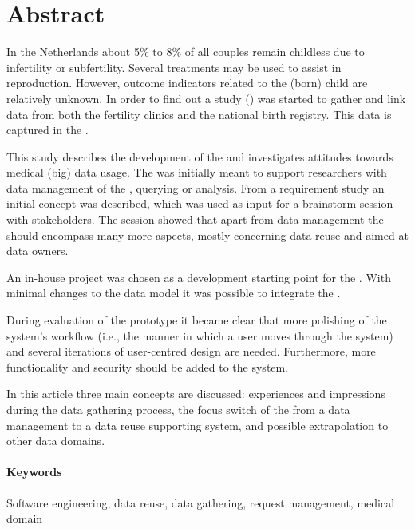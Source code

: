 \clearpage
{}
{}

\section*{Abstract}

In the Netherlands about 5\% to 8\% of all couples remain childless due to infertility or subfertility. 
Several treatments may be used to assist in reproduction. 
However, outcome indicators related to the (born) child are relatively unknown. 
In order to find out a study (\project{}) was started to gather and link data from both the fertility clinics and the national birth registry. 
This data is captured in the \projectdata{}.

This study describes the development of the \ivfsystem{} and investigates attitudes towards medical (big) data usage. 
The \ivfsystem{} was initially meant to support researchers with data management of the \projectdata{}, \eg{} querying or analysis. 
From a requirement study an initial concept was described, which was used as input for a brainstorm session with stakeholders.
The session showed that apart from data management the \ivfsystem{} should encompass many more aspects, mostly concerning data reuse and aimed at data owners. 

An in-house project was chosen as a development starting point for the \ivfsystem{}. 
With minimal changes to the data model it was possible to integrate the \projectdata{}.

During evaluation of the prototype it became clear that more polishing of the system's workflow (i.e., the manner in which a user moves through the system) and several iterations of user-centred design are needed. 
Furthermore, more functionality and security should be added to the system.

In this article three main concepts are discussed: experiences and impressions during the data gathering process, the focus switch of the \ivfsystem{} from a data management to a data reuse supporting system, and possible extrapolation to other data domains. 

\paragraph{Keywords}
Software engineering, data reuse, data gathering, request management, medical domain
